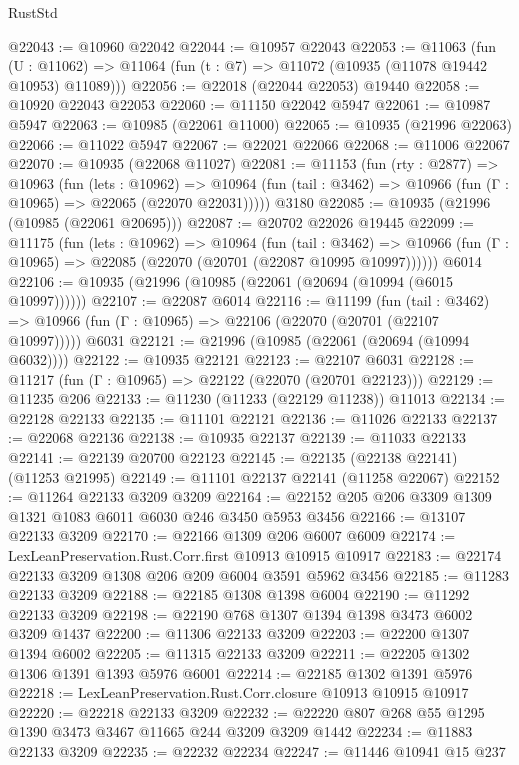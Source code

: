 \begin{lexlean}{RustStd}
\begin{coremodule}
{{{{{{{{{{{{{{{{{{{@22043 := @10960 @22042
@22044 := @10957 @22043
@22053 := @11063
    (fun (U : @11062) => @11064 (fun (t : @7) => @11072 (@10935 (@11078 @19442 @10953) @11089)))
@22056 := @22018 (@22044 @22053) @19440
@22058 := @10920 @22043 @22053
@22060 := @11150 @22042 @5947
@22061 := @10987 @5947
@22063 := @10985 (@22061 @11000)
@22065 := @10935 (@21996 @22063)
@22066 := @11022 @5947
@22067 := @22021 @22066
@22068 := @11006 @22067
@22070 := @10935 (@22068 @11027)
@22081 := @11153
    (fun (rty : @2877) =>
    @10963
      (fun (lets : @10962) =>
      @10964 (fun (tail : @3462) => @10966 (fun (Γ : @10965) => @22065 (@22070 @22031)))))
    @3180
@22085 := @10935 (@21996 (@10985 (@22061 @20695)))
@22087 := @20702 @22026 @19445
@22099 := @11175
    (fun (lets : @10962) =>
    @10964
      (fun (tail : @3462) =>
      @10966 (fun (Γ : @10965) => @22085 (@22070 (@20701 (@22087 @10995 @10997))))))
    @6014
@22106 := @10935 (@21996 (@10985 (@22061 (@20694 (@10994 (@6015 @10997))))))
@22107 := @22087 @6014
@22116 := @11199
    (fun (tail : @3462) => @10966 (fun (Γ : @10965) => @22106 (@22070 (@20701 (@22107 @10997)))))
    @6031
@22121 := @21996 (@10985 (@22061 (@20694 (@10994 @6032))))
@22122 := @10935 @22121
@22123 := @22107 @6031
@22128 := @11217 (fun (Γ : @10965) => @22122 (@22070 (@20701 @22123)))
@22129 := @11235 @206
@22133 := @11230 (@11233 (@22129 @11238)) @11013
@22134 := @22128 @22133
@22135 := @11101 @22121
@22136 := @11026 @22133
@22137 := @22068 @22136
@22138 := @10935 @22137
@22139 := @11033 @22133
@22141 := @22139 @20700 @22123
@22145 := @22135 (@22138 @22141) (@11253 @21995)
@22149 := @11101 @22137 @22141 (@11258 @22067)
@22152 := @11264 @22133 @3209 @3209
@22164 := @22152 @205 @206 @3309 @1309 @1321 @1083 @6011 @6030 @246 @3450 @5953 @3456
@22166 := @13107 @22133 @3209
@22170 := @22166 @1309 @206 @6007 @6009
@22174 := LexLeanPreservation.Rust.Corr.first @10913 @10915 @10917
@22183 := @22174 @22133 @3209 @1308 @206 @209 @6004 @3591 @5962 @3456
@22185 := @11283 @22133 @3209
@22188 := @22185 @1308 @1398 @6004
@22190 := @11292 @22133 @3209
@22198 := @22190 @768 @1307 @1394 @1398 @3473 @6002 @3209 @1437
@22200 := @11306 @22133 @3209
@22203 := @22200 @1307 @1394 @6002
@22205 := @11315 @22133 @3209
@22211 := @22205 @1302 @1306 @1391 @1393 @5976 @6001
@22214 := @22185 @1302 @1391 @5976
@22218 := LexLeanPreservation.Rust.Corr.closure @10913 @10915 @10917
@22220 := @22218 @22133 @3209
@22232 := @22220 @807 @268 @55 @1295 @1390 @3473 @3467 @11665 @244 @3209 @3209 @1442
@22234 := @11883 @22133 @3209
@22235 := @22232 @22234
@22247 := @11446
    @10941
    @15
    @237
}}}}}}}}}}}}}}}}}}}
\end{coremodule}
\end{lexlean}
